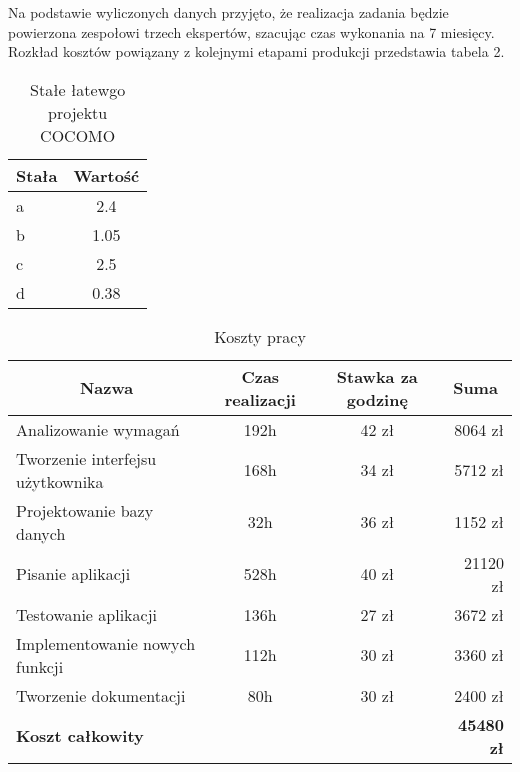 Na podstawie wyliczonych danych przyjęto, że realizacja zadania będzie powierzona zespołowi trzech ekspertów, szacując czas wykonania na 7 miesięcy. Rozkład kosztów powiązany z kolejnymi etapami produkcji przedstawia tabela 2.

\begin{table}[ht]
\begin{center}
\caption{Stałe łatewgo projektu COCOMO}
\begin{tabular}{| l | c |}
    \hline
		Stała & Wartość \\
	\hline
		a & 2.4 \\
	\hline
		b & 1.05 \\
	\hline
		c & 2.5 \\
	\hline
		d & 0.38 \\
    \hline

 \end{tabular}
 \end{center}
 \end{table}

  \begin{table}[ht]
  \begin{center}
  \caption{Koszty pracy}
  \begin{tabular}{| l | c | c | r |}
    \hline
      \multicolumn{1}{|c|}{Nazwa} & \multicolumn{1}{|c|}{Czas realizacji} & \multicolumn{1}{|c|}{Stawka za godzinę} & \multicolumn{1}{|c|}{Suma} \\
    \hline
      Analizowanie wymagań & 192h & 42 zł & 8064 zł \\
    \hline
      Tworzenie interfejsu użytkownika & 168h  & 34 zł & 5712 zł \\
    \hline
      Projektowanie bazy danych & 32h & 36 zł & 1152 zł \\
    \hline
      Pisanie aplikacji & 528h  & 40 zł & 21120 zł \\
    \hline
      Testowanie aplikacji & 136h & 27 zł & 3672 zł \\
    \hline
      Implementowanie nowych funkcji & 112h & 30 zł & 3360 zł \\
    \hline
      Tworzenie dokumentacji & 80h & 30 zł & 2400 zł \\
    \hline
      \multicolumn{3}{|l}{\textbf{Koszt całkowity}} & \textbf{45480 zł} \\
    \hline
  \end{tabular}
  \end{center}
  \end{table}

